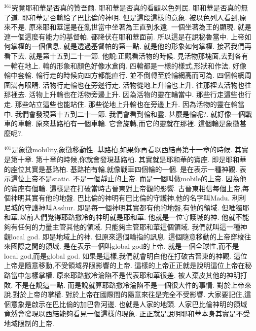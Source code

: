\documentclass{book}
\begin{document}
$^{361}$究竟耶和華是否真的贊吾爾.
耶和華是否真的看顧以色列民.
耶和華是否真的無了道.
耶和華是否輸給了巴比倫的神明.
但是這段這樣的意象.
被以色列人看到,原來不是.
原來耶和華還是在亂世當中坐著為王直到永遠.
一個坐著為王的顯現.
就是連一個這麼有能力的基督帕.
都降伏在耶和華面前.
所以這是在說秘魯當中.
上帝如何掌權的一個信息.
就是透過基督帕的第一點.
就是他的形象如何掌權.
接著我們再看下去.
就是第十五到二十一節.
他說:正觀看活物的時候.
見活物那塊面,去到各有一輪在地上.
輪的形象和顏色好像水倉肉.
四輪都是一樣的樣式,形狀和作法.
好像輪中套輪.
輪行走的時候向四方都能直行.
並不倒轉至於輪網高而可為.
四個輪網周圍滿有眼睛.
活物行走輪也在旁邊行走.
活物從地上升輪也上升.
往那裡去活物也往那裡去.
活物上升輪也在活物旁邊上升.
因為活物的靈在輪當中.
那些行走這些也行走.
那些站立這些也能站住.
那些從地上升輪也在旁邊上升.
因為活物的靈在輪當中.
我們會發現第十五到二十一節.
我們會看到輪和靈.
甚麼是輪呢?.
就好像一個戰車的車輪.
原來基路柏有一個車輪.
它會旋轉,而它的靈就在那裡.
這個輪是象徵甚麼呢?.

$^{401}$是象徵mobility,象徵移動性.
基路柏,如果你再看以西結書第十一章的時候.
其實是第十章.
第十章的時候,你就會發現基路柏.
其實就是耶和華的寶座.
即是耶和華的座位其實是基路柏.
基路柏有輪,就像戰車四個輪的一個.
是在表示一種神觀.
表示這位上帝不是static.
不是一個靜止的上帝.
而是一個叫做mobile的上帝.
因為他的寶座有個輪.
這樣是在打破當時古晉東對上帝觀的影響.
古晉東相信每個上帝,每個神明其實有他的地盤.
巴比倫的神明有巴比倫的守護神,他的名字叫Madu.
利利尼城的守護神叫Asshur.
即是每一個神明其實都有他的地盤,有他的領域.
但唯獨耶和華,以前人們覺得耶路撒冷的神明就是耶和華.
他就是一位守護城的神.
他就不能夠有任何的力量主管其他的領域.
只能夠主管耶和華這個領域.
我們就叫這一種神觀local god.
即是地域上的神.
但原來這個輪指的訊息.
這個隨意移動的上帝穿梭往來國際之間的領域.
是在表示一個叫global god的上帝.
就是一個全球性,而不是local god,而是global god.
如果是這樣,我們就會明白他在打破古晉東的神觀.
這位上帝是隨意移動,不受領域界限影響的上帝.
這樣的上帝正正就是說明這位上帝在秘路當中怎樣掌權.
原來耶路撒冷淪陷不是代表耶和華很差.
被人棄皮其他的神明打敗.
不是在說這一點.
而是說就算耶路撒冷淪陷不是一個很大件的事情.
對於上帝來說,對於上帝的掌權.
對於上帝在國際間的隨意來往是完全不受影響.
大家要記住,這個意象是啟示在巴比倫的加巴魯河邊.
也就是人家的地頭.
人家巴比倫神明的領域竟然會發現以西結能夠看見一個這樣的現象.
正正就是說明耶和華本身其實是不受地域限制的上帝.
\end{document}
